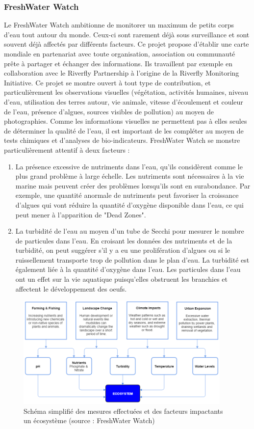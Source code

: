 \documentclass[10pt, article]{llncs}
\begin{document}
		\subsubsection{FreshWater Watch}
			Le FreshWater Watch ambitionne de monitorer un maximum de petits corps d'eau tout autour du monde. Ceux-ci sont rarement déjà sous surveillance et sont souvent déjà affectés par différents facteurs. Ce projet propose d'établir une carte mondiale en partenariat avec toute organisation, association ou communauté prête à partager et échanger des informations. Ils travaillent par exemple en collaboration avec le Riverfly Partnership à l'origine de la Riverfly Monitoring Initiative. Ce projet se montre ouvert à tout type de contribution, et particulièrement les observations visuelles (végétation, activités humaines, niveau d'eau, utilisation des terres autour, vie animale, vitesse d'écoulement et couleur de l'eau, présence d'algues, sources visibles de pollution) au moyen de photographies. Comme les informations visuelles ne permettent pas à elles seules de déterminer la qualité de l'eau, il est important de les compléter au moyen de tests chimiques et d'analyses de bio-indicateurs. FreshWater Watch se monstre particulièrement attentif à deux facteurs :
			\begin{enumerate}
				\item La présence excessive de nutriments dans l'eau, qu'ils considèrent comme le plus grand problème à large échelle. Les nutriments sont nécessaires à la vie marine mais peuvent créer des problèmes lorsqu'ils sont en surabondance. Par exemple, une quantité anormale de nutriments peut favoriser la croissance d'algues qui vont réduire la quantité d'oxygène disponible dans l'eau, ce qui peut mener à l'apparition de "Dead Zones".
				\item La turbidité de l'eau au moyen d'un tube de Secchi pour mesurer le nombre de particules dans l'eau. En croisant les données des nutriments et de la turbidité, on peut suggérer s'il y a eu une prolifération d'algues ou si le ruissellement transporte trop de pollution dans le plan d'eau. La turbidité est également liée à la quantité d'oxygène dans l'eau. Les particules dans l'eau ont un effet sur la vie aquatique puisqu'elles obstruent les branchies et affectent le développement des oeufs.
			\end{enumerate}
			\begin{figure}
				\begin{center}
					\includegraphics[width=300pt]{img/ecosystem-flowchart.png}
				\end{center}
				\caption{Schéma simplifié des mesures effectuées et des facteurs impactants un écosystème (source : FreshWater Watch)}
			\end{figure}
\end{document}
